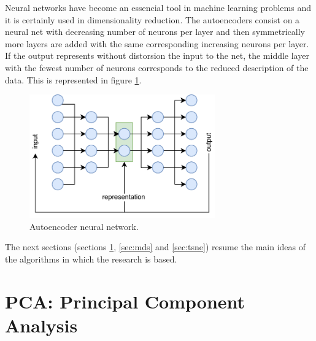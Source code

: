 \documentclass[a4paper,11pt,spanish]{report}
\begin{document}
Neural networks have become an essencial tool in machine learning problems and it is certainly used in dimensionality reduction. The autoencoders \citep{auto2, auto} consist on a neural net with decreasing number of neurons per layer and then symmetrically more layers are added with the same corresponding increasing neurons per layer. If the output represents without distorsion the input to the net, the middle layer with the fewest number of neurons corresponds to the reduced description of the data. This is represented in figure \ref{autoencoder}.

\begin{figure}[h]
\centering
\includegraphics[width=8cm]{figures/autoencoder.pdf}
\caption{\label{autoencoder}Autoencoder neural network.}
\end{figure}

The next sections (sections \ref{sec:pca}, \ref{sec:mds} and \ref{sec:tsne}) resume the main ideas of the algorithms in which the research is based. 

\section{PCA: Principal Component Analysis}
\label{sec:pca}
\end{document}
